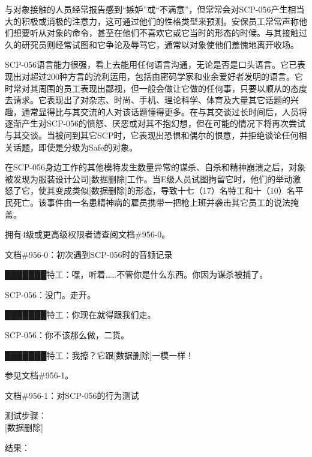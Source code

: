 与对象接触的人员经常报告感到“嫉妒”或“不满意”，但常常会对SCP-056产生相当大的积极或消极的注意力，这可通过他们的性格类型来预测。安保员工常常声称他们想要听从对象的命令，甚至在他们不喜欢它或它当时的形态的时候。与其接触过久的研究员则经常试图和它争论及辱骂它，通常以对象使他们羞愧地离开收场。

SCP-056语言能力很强，看上去能用任何语言沟通，无论是否是口头语言。它已表现出对超过200种方言的流利运用，包括由密码学家和业余爱好者发明的语言。它时常对其周围的员工表现出鄙视，但一般会做让它做的任何事，只要以顺从的态度去请求。它表现出了对杂志、时尚、手机、理论科学、体育及大量其它话题的兴趣，通常显得比与其交流的人对该话题懂得更多。在与其交谈过长时间后，人员将逐渐产生对SCP-056的愤怒、厌恶或对其不抱幻想，但在可能的情况下将再次尝试与其交谈。当被问到其它SCP时，它表现出恐惧和偶尔的恨意，并拒绝谈论任何相关话题，即使是分级为Safe的对象。

在SCP-056身边工作的其他模特发生数量异常的谋杀、自杀和精神崩溃之后，对象被发现为服装设计公司{[}数据删除]工作。当E级人员试图拘留它时，他们的举动激怒了它，使其变成类似{[}数据删除]的形态，导致十七（17）名特工和十（10）名平民死亡。该事件由一名患精神病的雇员携带一把枪上班并袭击其它员工的说法掩盖。

拥有4级或更高级权限者请查阅文档\#956-0。

文档\#956-0：初次遇到SCP-056时的音频记录


███████特工：嘿，听着……不管你是什么东西。你因为谋杀被捕了。

SCP-056：没门。走开。


███████特工：你现在就得跟我们走。

SCP-056：你不该那么做，二货。


███████特工：我擦？它跟{[}数据删除]一模一样！



参见文档\#956-1。

文档\#956-1：对SCP-056的行为测试

测试步骤：\\
{[}数据删除]

结果：

